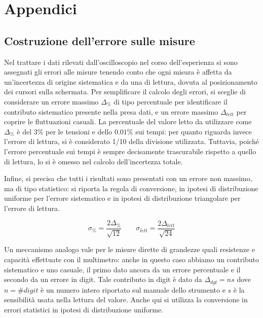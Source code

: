 \documentclass{article}
\begin{document}
\newpage
\appendix
\section{Appendici}
\label{appendice}
\subsection{Costruzione dell'errore sulle misure}
\label{Calcerr}

Nel trattare i dati rilevati dall'oscilloscopio nel corso dell'esperienza si sono assegnati gli errori alle misure tenendo conto che ogni misura è affetta da un'incertezza di origine sistematica e da una di lettura, dovuta al posizionamento dei cursori sulla schermata. Per semplificare il calcolo degli errori, si sceglie di considerare un errore massimo $\Delta_{\%}$ di tipo percentuale per identificare il contributo sistematico presente nella presa dati, e un errore massimo $\Delta_{lett}$ per coprire le fluttuazioni casuali. La percentuale del valore letto da utilizzare come $\Delta_{\%}$ è del $3\%$ per le tensioni e dello $0.01\%$ sui tempi: per quanto riguarda invece l'errore di lettura, si è considerato 1/10 della divisione utilizzata.
Tuttavia, poiché l'errore percentuale sui tempi è sempre decisamente trascurabile rispetto a quello di lettura, lo si è omesso nel calcolo dell'incertezza totale.

Infine, si precisa che tutti i risultati sono presentati con un errore non massimo, ma di tipo statistico: si riporta la regola di conversione, in ipotesi di distribuzione uniforme per l'errore sistematico e in ipotesi di distribuzione triangolare per l'errore di lettura.

\begin{equation}
\sigma_{\%}=\frac{2\Delta_{\%}}{\sqrt{12}} \quad \quad \sigma_{lett}=\frac{2\Delta_{lett}}{\sqrt{24}}
\end{equation}

Un meccanismo analogo vale per le misure dirette di grandezze quali resistenze e capacità effettuate con il multimetro: anche in questo caso abbiamo un contributo sistematico e uno casuale, il primo dato ancora da un errore percentuale e il secondo da un errore in digit. Tale contributo in digit è dato da $\Delta_{dgt}=ns$ dove $n=\#digit$ è un numero intero riportato sul manuale dello strumento e $s$ è la sensibilità usata nella lettura del valore. Anche qui si utilizza la conversione in errori statistici in ipotesi di distribuzione uniforme.
\end{document}
